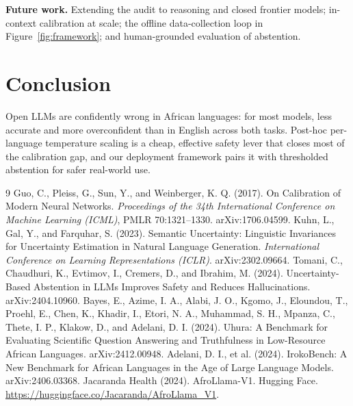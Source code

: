 \documentclass[pmlr]{jmlr}%
\begin{document}
\textbf{Future work.} Extending the audit to reasoning and closed frontier models; in-context
calibration at scale; the offline data-collection loop in Figure~\ref{fig:framework}; and
human-grounded evaluation of abstention.

\section{Conclusion}
Open LLMs are confidently wrong in African languages: for most models, less accurate and more
overconfident than in English across both tasks. Post-hoc per-language temperature scaling is a cheap,
effective safety lever that closes most of the calibration gap, and our deployment framework pairs it
with thresholded abstention for safer real-world use.


\begin{thebibliography}{9}\small
{} Guo, C., Pleiss, G., Sun, Y., and Weinberger, K. Q. (2017). On
Calibration of Modern Neural Networks. \textit{Proceedings of the 34th International Conference on
Machine Learning (ICML)}, PMLR 70:1321--1330. arXiv:1706.04599.
 Kuhn, L., Gal, Y., and Farquhar, S. (2023). Semantic
Uncertainty: Linguistic Invariances for Uncertainty Estimation in Natural Language Generation.
\textit{International Conference on Learning Representations (ICLR)}. arXiv:2302.09664.
 Tomani, C., Chaudhuri, K., Evtimov, I., Cremers, D., and
Ibrahim, M. (2024). Uncertainty-Based Abstention in LLMs Improves Safety and Reduces Hallucinations.
arXiv:2404.10960.
 Bayes, E., Azime, I. A., Alabi, J. O., Kgomo, J., Eloundou, T.,
Proehl, E., Chen, K., Khadir, I., Etori, N. A., Muhammad, S. H., Mpanza, C., Thete, I. P., Klakow, D.,
and Adelani, D. I. (2024). Uhura: A Benchmark for Evaluating Scientific Question Answering and
Truthfulness in Low-Resource African Languages. arXiv:2412.00948.
 Adelani, D. I., et al. (2024). IrokoBench: A New Benchmark
for African Languages in the Age of Large Language Models. arXiv:2406.03368.
 Jacaranda Health (2024). AfroLlama-V1. Hugging Face.
\url{https://huggingface.co/Jacaranda/AfroLlama_V1}.
\end{thebibliography}
\end{document}
